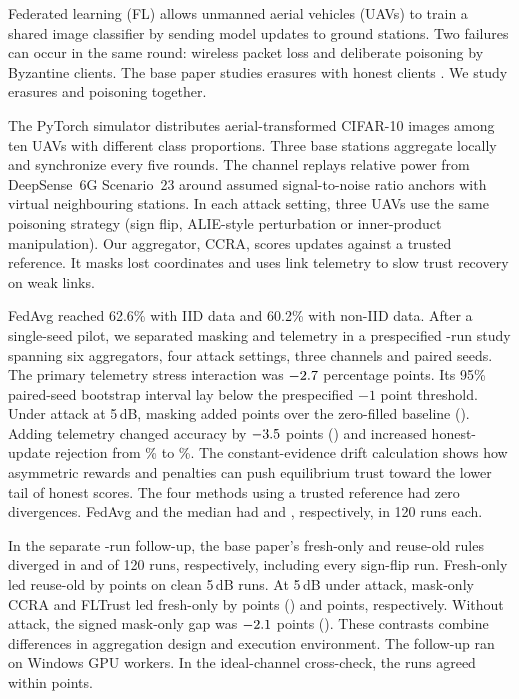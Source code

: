 \thispagestyle{plain}

Federated learning (FL) allows unmanned aerial vehicles (UAVs) to train a shared
image classifier by sending model updates to ground stations. Two failures can
occur in the same round: wireless packet loss and deliberate poisoning by
Byzantine clients. The base paper studies erasures with honest clients
\cite{shirvanimoghaddam2022erroneous}. We study erasures and poisoning together.

The PyTorch simulator distributes aerial-transformed CIFAR-10 images among ten
UAVs with different class proportions. Three base stations aggregate locally and synchronize every five rounds.
The channel replays relative power from DeepSense~6G Scenario~23 around assumed
signal-to-noise ratio anchors with virtual neighbouring stations. In each attack
setting, three UAVs use the same poisoning strategy (sign flip, ALIE-style
perturbation or inner-product manipulation). Our aggregator, CCRA, scores updates
against a trusted reference. It masks lost coordinates and uses link telemetry
to slow trust recovery on weak links.

FedAvg reached 62.6\% with IID data and 60.2\% with non-IID data. After a single-seed
pilot, we separated masking and telemetry in a prespecified \NumRuns-run study
spanning six aggregators, four attack settings, three channels and \NumSeeds{} paired
seeds. The primary telemetry stress interaction was $-2.7$ percentage
points. Its 95\% paired-seed bootstrap interval \ci{\PrimLo}{\PrimHi} lay below
the prespecified $-1$ point threshold. Under attack at 5\,dB, masking added \MaskGain{}
points over the zero-filled baseline (\ci{\MaskLo}{\MaskHi}). Adding telemetry
changed accuracy by $-3.5$ points (\ci{\TelLo}{\TelHi}) and increased honest-update
rejection from \RejMask\% to \RejCcra\%. The constant-evidence drift calculation
shows how asymmetric rewards and penalties can push equilibrium trust toward
the lower tail of honest scores. The four methods using a trusted reference
had zero divergences. FedAvg and the median had \DivFedavg{} and \DivMedian{},
respectively, in 120 runs each.

In the separate \BpNumRuns-run follow-up, the base paper's fresh-only and reuse-old
rules diverged in \BpDivFresh{} and \BpDivReuse{} of 120 runs, respectively, including
every sign-flip run. Fresh-only led reuse-old by \BpCleanGain{} points on clean
5\,dB runs. At 5\,dB under attack, mask-only CCRA and FLTrust led fresh-only by
\VsBpAttack{} points (\ci{\VsBpAttackLo}{\VsBpAttackHi}) and \FltVsBpAttack{} points,
respectively. Without attack, the signed mask-only gap was $-2.1$ points
(\ci{\VsBpCleanLo}{\VsBpCleanHi}). These contrasts combine differences in
aggregation design and execution environment. The follow-up ran on Windows GPU
workers. In the ideal-channel cross-check, the runs agreed within \XcheckMax{} points.

